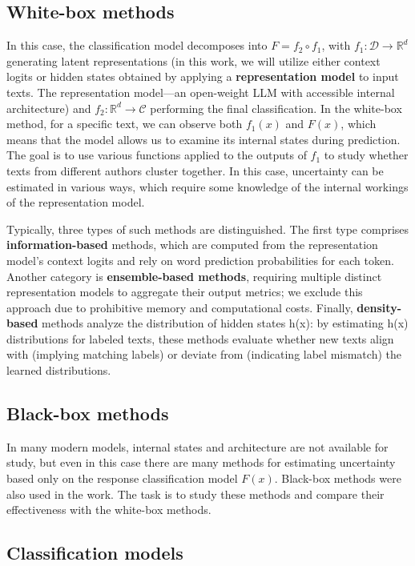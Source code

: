 \documentclass[a4paper, 12pt]{article}
\begin{document}
\subsection {White-box methods}  
In this case, the classification model decomposes into \( F = f_2 \circ f_1 \), with \( f_1: \mathcal{D} \rightarrow \mathbb{R}^d \) generating latent representations (in this work, we will utilize either context logits or hidden states obtained by applying a \textbf{representation model} to input texts. The representation model—an open-weight LLM with accessible internal architecture) and \( f_2: \mathbb{R}^d \rightarrow \mathcal{C} \) performing the final classification. In the white-box method, for a specific text, we can observe both \(f_1(x)\) and \(F(x)\), which means that the model allows us to examine its internal states during prediction. The goal is to use various functions applied to the outputs of $f_1$ to study whether texts from different authors cluster together. In this case, uncertainty can be estimated in various ways\citep{Polygraph}, which require some knowledge of the internal workings of the representation model. 

Typically, three types of such methods are distinguished. The first type comprises \textbf{information-based} methods, which are computed from the representation model's context logits and rely on word prediction probabilities for each token. Another category is \textbf{ensemble-based methods}, requiring multiple distinct representation models to aggregate their output metrics; we exclude this approach due to prohibitive memory and computational costs. Finally, \textbf{density-based} methods analyze the distribution of hidden states h(x): by estimating h(x) distributions for labeled texts, these methods evaluate whether new texts align with (implying matching labels) or deviate from (indicating label mismatch) the learned distributions.

\subsection {Black-box methods}   
In many modern models, internal states and architecture are not available for study, but even in this case there are many methods for estimating uncertainty based only on the response classification model \(F(x)\). Black-box methods were also used in the work\citep{Polygraph}. The task is to study these methods and compare their effectiveness with the white-box methods. 

\subsection{Classification models}
\end{document}
